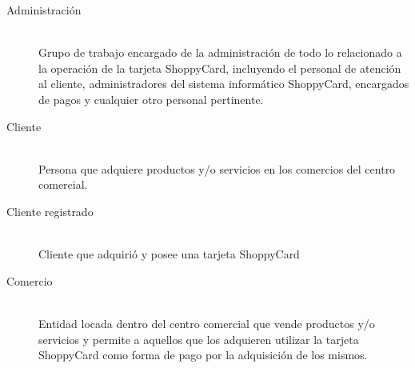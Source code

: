 \begin{description}

\item[Administración] \hfill \\
Grupo de trabajo encargado de la administración de todo lo relacionado a la operación de la tarjeta ShoppyCard, incluyendo el personal de atención al cliente, administradores del sistema informático ShoppyCard, encargados de pagos y cualquier otro personal pertinente.

\item[Cliente] \hfill \\
Persona que adquiere productos y/o servicios en los comercios del centro comercial.

\item[Cliente registrado] \hfill \\
Cliente que adquirió y posee una tarjeta ShoppyCard

\item[Comercio] \hfill \\
Entidad locada dentro del centro comercial que vende productos y/o servicios y permite a aquellos que los adquieren utilizar la tarjeta ShoppyCard como forma de pago por la adquisición de los mismos.

\end{description}
